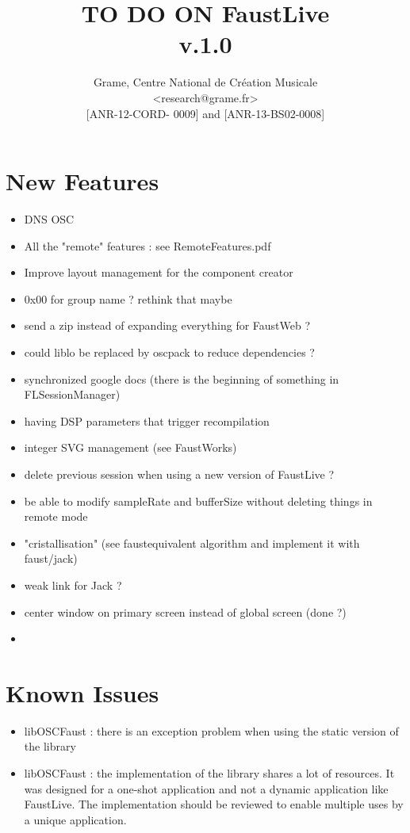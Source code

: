 \documentclass[a4paper]{article}
\begin{document}
\title{TO DO ON FaustLive \\ v.1.0}

\author{Grame, Centre National de Création Musicale\\
{\small <research@grame.fr>} \\
\vspace{2mm}
[ANR-12-CORD- 0009] and [ANR-13-BS02-0008]
}

\maketitle


\newpage
\section{New Features}

\begin{itemize}
\item DNS OSC 
\item All the "remote" features : see RemoteFeatures.pdf
\item Improve layout management for the component creator
\item 0x00 for group name ? rethink that maybe
\item send a zip instead of expanding everything for FaustWeb ?
\item could liblo be replaced by oscpack to reduce dependencies ?
\item synchronized google docs (there is the beginning of something in FLSessionManager)
\item having DSP parameters that trigger recompilation
\item integer SVG management (see FaustWorks)
\item delete previous session when using a new version of FaustLive ?
\item be able to modify sampleRate and bufferSize without deleting things in remote mode
\item "cristallisation" (see faustequivalent algorithm and implement it with faust/jack)
\item weak link for Jack ?
\item center window on primary screen instead of global screen (done ?)
\item 
\end{itemize}

\section{Known Issues}

\begin{itemize}
\item libOSCFaust : there is an exception problem when using the static version of the library
\item libOSCFaust : the implementation of the library shares a lot of resources. It was designed for a one-shot application and not a dynamic application like FaustLive. The implementation should be reviewed to enable multiple uses by a unique application. 
\end{itemize}
\end{document}
